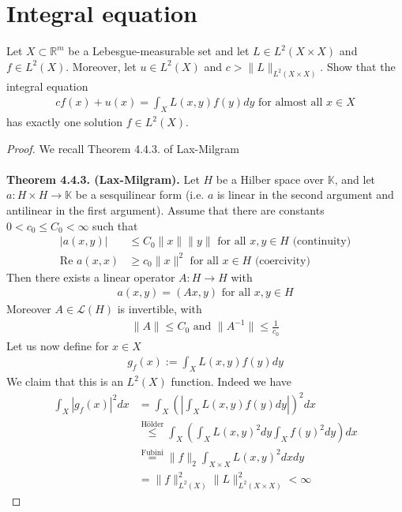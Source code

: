 \documentclass[12pt,a4paper]{article}
\begin{document}
\section{Integral equation}
Let $X \subset \mathbb{R}^m$ be a Lebesgue-measurable set and let $L \in L^2(X \times X)$ and $f \in L^2(X)$. Moreover,  let $u \in L^2(X)$ and $c> \|L\|_{L^2(X \times X)}$. Show that the integral equation 
\begin{align*}
cf(x) + u(x) = \int_X L(x,y) f(y)dy \text{ for almost all } x \in X 
\end{align*}
has exactly one solution $f \in L^2(X)$. 
\begin{proof}
We recall Theorem 4.4.3. of Lax-Milgram
\\\\
\textbf{Theorem 4.4.3. (Lax-Milgram).} Let $H$ be a Hilber space over $\mathbb{K}$, and let $a:H \times H \to \mathbb{K}$ be a sesquilinear form (i.e. $a$ is linear in the second argument and antilinear in the first argument). Assume that there are constants $0 <c_0 \leq C_0 < \infty$ such that
\begin{align*}
|a(x,y)| & \leq C_0 \|x \| \|y \| \text{ for all } x,y \in H \text{ (continuity)} \\
\text{Re }a (x,x) & \geq c_0 \| x \|^2 \text{ for all } x \in H \text{ (coercivity)}
\end{align*}
Then there exists a linear operator $A: H \to H$ with 
\begin{align*}
a(x,y)=(Ax,y) \text{ for all } x,y \in H 
\end{align*}
Moreover $A \in \mathcal{L}(H)$ is invertible, with 
\begin{align*}
\| A \| \leq C_0 \text{ and } \|A^{-1}\| \leq \frac{1}{c_0}
\end{align*}
Let us now define for $x \in X$ \begin{align*}
g_f(x):= \int_X L(x,y) f(y) dy 
\end{align*}
We claim that this is an $L^2(X)$ function. Indeed we have
\begin{align*}
\int_X |g_f(x)|^2 dx &= \int_X \left( \left| \int_X L(x,y)f(y)dy \right| \right)^2 dx \\
& \overset{\text{Hölder}}\leq \int_X \left( \int_X L(x,y)^2dy \int_X f(y)^2 dy \right) dx  \\
&\overset{\text{Fubini}}= \|f\|_2 \int_{X \times X} L(x,y)^2 dx dy \\ &  = \|f\|_{L^2(X)}^2 \|L\|_{L^2(X \times X)}^2   < \infty 
\end{align*}

\end{proof}
\end{document}
